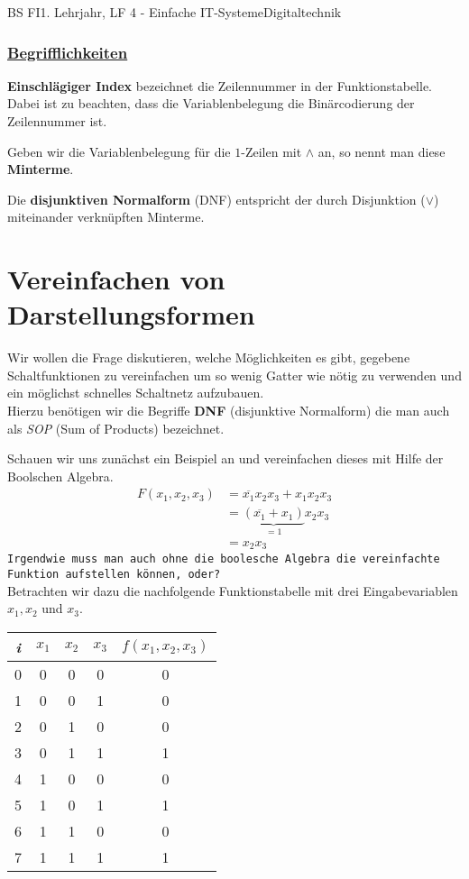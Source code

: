 \documentclass[11pt,twocolumn,oneside,openany,headings=optiontotoc,11pt,numbers=noenddot]{article}
\begin{document}
	\begin{worksheet}{BS FI}{1. Lehrjahr, LF 4 - Einfache IT-Systeme}{Digitaltechnik}
		\setcounter{section}{7}
		\subsubsection*{\underline{Begrifflichkeiten}}
		\textbf{Einschlägiger Index} bezeichnet die Zeilennummer in der Funktionstabelle. Dabei ist zu beachten, dass die Variablenbelegung die Binärcodierung der Zeilennummer ist.\\
		\par\noindent
		Geben wir die Variablenbelegung für die \(1\)-Zeilen mit \(\wedge\) an, so nennt man diese \textbf{Minterme}.\\
		\par\noindent
		Die \textbf{disjunktiven Normalform} (DNF) entspricht der durch Disjunktion (\(\vee\)) miteinander verknüpften Minterme.
		\section{Vereinfachen von Darstellungsformen}
		Wir wollen die Frage diskutieren, welche Möglichkeiten es gibt, gegebene Schaltfunktionen zu vereinfachen um so wenig Gatter wie nötig zu verwenden und ein möglichst schnelles Schaltnetz aufzubauen.\\
		Hierzu benötigen wir die Begriffe \textbf{DNF} (disjunktive Normalform)  die man auch als \textit{SOP} (Sum of Products) bezeichnet.\\
		\par\noindent
		Schauen wir uns zunächst ein Beispiel an und vereinfachen dieses mit Hilfe der Boolschen Algebra.
		\begin{align*}
			F(x_1,x_2,x_3) &= \overline{x_1}x_2x_3 + x_1x_2x_3\\
			&= \underbrace{(\overline{x_1} + x_1)}_{=1}x_2x_3\\
			&= x_2x_3
		\end{align*}
		\texttt{Irgendwie muss man auch ohne die boolesche Algebra die vereinfachte Funktion aufstellen können, oder?}\\
		Betrachten wir dazu die nachfolgende Funktionstabelle mit drei Eingabevariablen \(x_1, x_2\) und \(x_3\).
		\begin{center}
			\begin{tabular}{|c|ccc|c|}
				\hline
				\textit{i} & \(x_1\) & \(x_2\) & \(x_3\) & \(f(x_1,x_2,x_3)\)\\
				\hline
				0 & 0 & 0 & 0 & 0\\
				\hline
				1 & 0 & 0 & 1 & 0\\
				\hline
				2 & 0 & 1 & 0 & 0\\
				\hline
				3 & 0 & 1 & 1 & 1\\
				\hline
				4 & 1 & 0 & 0 & 0\\
				\hline
				5 & 1 & 0 & 1 & 1\\
				\hline
				6 & 1 & 1 & 0 & 0\\
				\hline
				7 & 1 & 1 & 1 & 1\\
				\hline
			\end{tabular}
		\end{center}

\end{worksheet}
\end{document}

